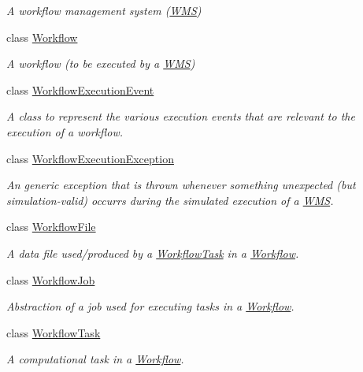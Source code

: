 \begin{DoxyCompactItemize}
\begin{DoxyCompactList}\small\item\em A workflow management system (\hyperlink{classwrench_1_1_w_m_s}{W\+MS}) \end{DoxyCompactList}\item 
class \hyperlink{classwrench_1_1_workflow}{Workflow}
\begin{DoxyCompactList}\small\item\em A workflow (to be executed by a \hyperlink{classwrench_1_1_w_m_s}{W\+MS}) \end{DoxyCompactList}\item 
class \hyperlink{classwrench_1_1_workflow_execution_event}{Workflow\+Execution\+Event}
\begin{DoxyCompactList}\small\item\em A class to represent the various execution events that are relevant to the execution of a workflow. \end{DoxyCompactList}\item 
class \hyperlink{classwrench_1_1_workflow_execution_exception}{Workflow\+Execution\+Exception}
\begin{DoxyCompactList}\small\item\em An generic exception that is thrown whenever something unexpected (but simulation-\/valid) occurrs during the simulated execution of a \hyperlink{classwrench_1_1_w_m_s}{W\+MS}. \end{DoxyCompactList}\item 
class \hyperlink{classwrench_1_1_workflow_file}{Workflow\+File}
\begin{DoxyCompactList}\small\item\em A data file used/produced by a \hyperlink{classwrench_1_1_workflow_task}{Workflow\+Task} in a \hyperlink{classwrench_1_1_workflow}{Workflow}. \end{DoxyCompactList}\item 
class \hyperlink{classwrench_1_1_workflow_job}{Workflow\+Job}
\begin{DoxyCompactList}\small\item\em Abstraction of a job used for executing tasks in a \hyperlink{classwrench_1_1_workflow}{Workflow}. \end{DoxyCompactList}\item 
class \hyperlink{classwrench_1_1_workflow_task}{Workflow\+Task}
\begin{DoxyCompactList}\small\item\em A computational task in a \hyperlink{classwrench_1_1_workflow}{Workflow}. \end{DoxyCompactList}\end{DoxyCompactItemize}
